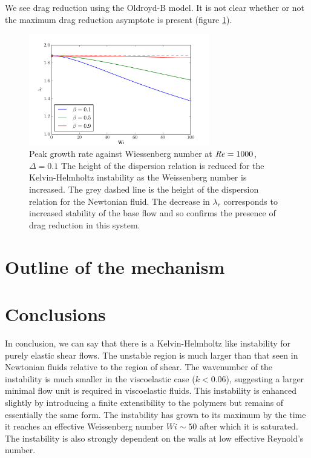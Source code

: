 \documentclass{jfm}
\newcommand\Rey{\mbox{\textit{Re}}}  %
\begin{document}
We see drag reduction using the Oldroyd-B model. It is not clear whether or not
the maximum drag reduction asymptote is present (figure
\ref{fig:KH_drag_reduction}).



\begin{figure}
    \centering
    \includegraphics[width=0.7\textwidth]{KH_high_Re_vary_Wi}
    \caption{
	Peak growth rate against Wiessenberg number at $\Rey = 1000$, $\Delta =
	0.1$ The height of the dispersion relation is reduced for the
	Kelvin-Helmholtz instability as the Weissenberg number is increased.
	The grey dashed line is the height of the dispersion relation for the
	Newtonian fluid. The decrease in $\lambda_{r}$ corresponds to increased
	stability of the base flow and so confirms the presence of drag
	reduction in this system.
    }
    \label{fig:KH_drag_reduction}
\end{figure}

\section{Outline of the mechanism}

\section{Conclusions}

In conclusion, we can say that there is a Kelvin-Helmholtz like instability for
purely elastic shear flows. The unstable region is much larger than that seen
in Newtonian fluids relative to the region of shear. The wavenumber of the
instability is much smaller in the viscoelastic case ($k<0.06$), suggesting a
larger minimal flow unit is required in viscoelastic fluids. This instability
is enhanced slightly by introducing a finite extensibility to the polymers but
remains of essentially the same form. The instability has grown to its maximum
by the time it reaches an effective Weissenberg number $ Wi \sim 50$ after
which it is saturated. The instability is also strongly dependent on the walls
at low effective Reynold's number.





\end{document}

